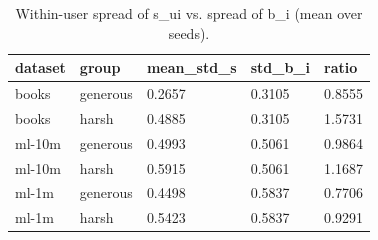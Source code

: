 \begin{table}[h]
\centering
\caption{Within-user spread of s_ui vs. spread of b_i (mean over seeds).}
\small
\begin{tabular}{lllll}
\toprule
dataset & group & mean\_std\_s & std\_b\_i & ratio \\
\midrule
books & generous & 0.2657 & 0.3105 & 0.8555 \\
books & harsh & 0.4885 & 0.3105 & 1.5731 \\
ml-10m & generous & 0.4993 & 0.5061 & 0.9864 \\
ml-10m & harsh & 0.5915 & 0.5061 & 1.1687 \\
ml-1m & generous & 0.4498 & 0.5837 & 0.7706 \\
ml-1m & harsh & 0.5423 & 0.5837 & 0.9291 \\
\bottomrule
\end{tabular}
\end{table}
